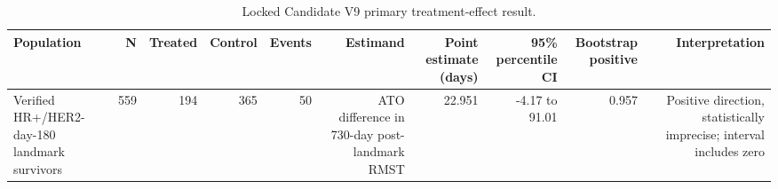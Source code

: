 \begin{table}[htbp]
\centering
\caption{Locked Candidate V9 primary treatment-effect result.}
\label{tab:candidate_v9_primary}
\small
\begin{tabular}{lrrrrrrrrr}
\toprule
Population & N & Treated & Control & Events & Estimand & Point estimate (days) & 95\% percentile CI & Bootstrap positive & Interpretation \\
\midrule
Verified HR+/HER2- day-180 landmark survivors & 559 & 194 & 365 & 50 & ATO difference in 730-day post-landmark RMST & 22.951 & -4.17 to 91.01 & 0.957 & Positive direction, statistically imprecise; interval includes zero \\
\bottomrule
\end{tabular}
\par\vspace{2pt}{\footnotesize The effect is treated minus control in post-landmark RMST days. The percentile patient-bootstrap interval is primary. ATO denotes the overlap target population.}
\end{table}
